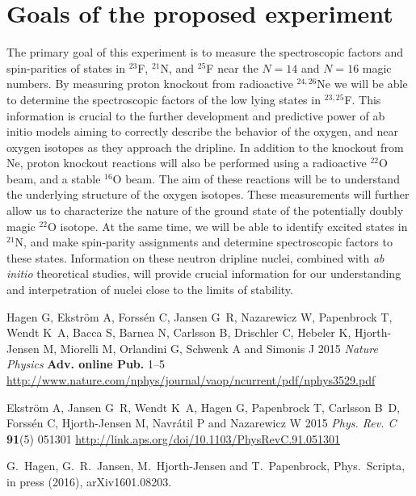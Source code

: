 \documentclass[prc,preprint,superscriptaddress,showpacs,floatfix]{revtex4-1}
\begin{document}
\section{Goals of the proposed experiment }
The primary goal of this experiment
is to measure the spectroscopic factors and spin-parities of 
states in $^{23}$F, $^{21}$N, and $^{25}$F near the $N=14$ and $N=16$ magic
numbers. By measuring proton knockout from radioactive $^{24,26}$Ne we will
be able to determine the spectroscopic factors of the low lying states
in $^{23,25}$F. This information is crucial to the further development and predictive power of
ab initio models aiming to correctly describe the behavior of the
oxygen, and near oxygen isotopes as they approach the dripline. In
addition to the knockout from Ne, proton knockout reactions will also
be performed using a radioactive $^{22}$O beam, and a stable $^{16}$O beam.  The
aim of these reactions will be to understand the underlying structure
of the oxygen isotopes. These measurements will further allow us to
characterize the nature of the ground state of the potentially doubly
magic $^{22}$O isotope. At the same time, we will be able to identify
excited states in $^{21}$N, and make spin-parity assignments and determine
spectroscopic factors to these states. Information on these neutron
dripline nuclei, combined with {\em ab initio} theoretical studies,  
will provide crucial information for our understanding and interpetration
of nuclei close to the limits of stability. 



\begin{thebibliography}{99}

{Hagen} G, {Ekstr{\"o}m} A, {Forss{\'e}n} C, {Jansen} G~R, {Nazarewicz} W,
  {Papenbrock} T, {Wendt} K~A, {Bacca} S, {Barnea} N, {Carlsson} B, {Drischler}
  C, {Hebeler} K, {Hjorth-Jensen} M, {Miorelli} M, {Orlandini} G, {Schwenk} A
  and {Simonis} J 2015 {\em Nature Physics\/} {\bf Adv. online Pub.} 1--5
  \urlprefix\url{http://www.nature.com/nphys/journal/vaop/ncurrent/pdf/nphys3529.pdf}

Ekstr\"om A, Jansen G~R, Wendt K~A, Hagen G, Papenbrock T, Carlsson B~D,
  Forss\'en C, Hjorth-Jensen M, Navr\'atil P and Nazarewicz W 2015 {\em Phys.
  Rev. C\/} {\bf 91}(5) 051301
  \urlprefix\url{http://link.aps.org/doi/10.1103/PhysRevC.91.051301}

G.~Hagen, G.~R.~Jansen,  M.~Hjorth-Jensen and T.~Papenbrock, Phys.~Scripta, in press (2016), arXiv1601.08203.
\end{thebibliography}
\end{document}
